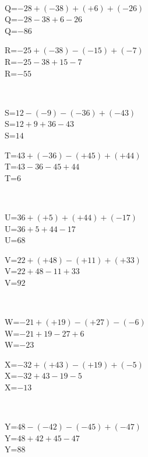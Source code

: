 \documentclass{article}%
\begin{document}
\\%
\begin{minipage}{0.5\textwidth}%
Q=$-28+(-38)+(+6)+(-26)$\\%
Q=$-28-38+6-26$\\%
Q=$-86$\\%
\end{minipage}%
\begin{minipage}{0.5\textwidth}%
R=$-25+(-38)-(-15)+(-7)$\\%
R=$-25-38+15-7$\\%
R=$-55$\\%
\end{minipage}%
\\%
\begin{minipage}{0.5\textwidth}%
S=$12-(-9)-(-36)+(-43)$\\%
S=$12+9+36-43$\\%
S=$14$\\%
\end{minipage}%
\begin{minipage}{0.5\textwidth}%
T=$43+(-36)-(+45)+(+44)$\\%
T=$43-36-45+44$\\%
T=$6$\\%
\end{minipage}%
\\%
\begin{minipage}{0.5\textwidth}%
U=$36+(+5)+(+44)+(-17)$\\%
U=$36+5+44-17$\\%
U=$68$\\%
\end{minipage}%
\begin{minipage}{0.5\textwidth}%
V=$22+(+48)-(+11)+(+33)$\\%
V=$22+48-11+33$\\%
V=$92$\\%
\end{minipage}%
\\%
\begin{minipage}{0.5\textwidth}%
W=$-21+(+19)-(+27)-(-6)$\\%
W=$-21+19-27+6$\\%
W=$-23$\\%
\end{minipage}%
\begin{minipage}{0.5\textwidth}%
X=$-32+(+43)-(+19)+(-5)$\\%
X=$-32+43-19-5$\\%
X=$-13$\\%
\end{minipage}%
\\%
\begin{minipage}{0.5\textwidth}%
Y=$48-(-42)-(-45)+(-47)$\\%
Y=$48+42+45-47$\\%
Y=$88$\\%
\end{minipage}

%
\end{document}
